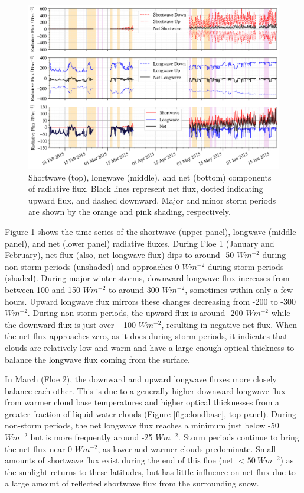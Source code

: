 \begin{figure}[h]
    \centering
    \includegraphics[width=1\linewidth]{figures/chapter4/RadComp.png}
    \caption[Shortwave, longwave, and net radiative components of flux.]{Shortwave (top), longwave (middle), and net (bottom) components of radiative flux. Black lines represent net flux, dotted indicating upward flux, and dashed downward. Major and minor storm periods are shown by the orange and pink shading, respectively.}
    \label{fig:flux:all}
\end{figure}

Figure \ref{fig:flux:all} shows the time series of the shortwave (upper panel), longwave (middle panel), and net (lower panel) radiative fluxes. During Floe 1 (January and February), net flux (also, net longwave flux) dips to around -50 $Wm^{-2}$ during non-storm periods (unshaded) and approaches 0 $Wm^{-2}$ during storm periods (shaded). During major winter storms, downward longwave flux increases from between 100 and 150 $W m^{-2}$ to around 300 $Wm^{-2}$, sometimes within only a few hours. Upward longwave flux mirrors these changes decreasing from -200 to -300 $Wm^{-2}$. During non-storm periods, the upward flux is around -200 $Wm^{-2}$ while the downward flux is just over +100 $Wm^{-2}$, resulting in negative net flux. When the net flux approaches zero, as it does during storm periods, it indicates that clouds are relatively low and warm and have a large enough optical thickness to balance the longwave flux coming from the surface.

In March (Floe 2), the downward and upward longwave fluxes more closely balance each other. This is due to a generally higher downward longwave flux from warmer cloud base temperatures and higher optical thicknesses from a greater fraction of liquid water clouds (Figure \ref{fig:cloudbase}, top panel). During non-storm periods, the net longwave flux reaches a minimum just below -50 $Wm^{-2}$ but is more frequently around -25 $Wm^{-2}$. Storm periods continue to bring the net flux near 0 $Wm^{-2}$, as lower and warmer clouds predominate. Small amounts of shortwave flux exist during the end of this floe (net $< 50~Wm^{-2}$) as the sunlight returns to these latitudes, but has little influence on net flux due to a large amount of reflected shortwave flux from the surrounding snow.

